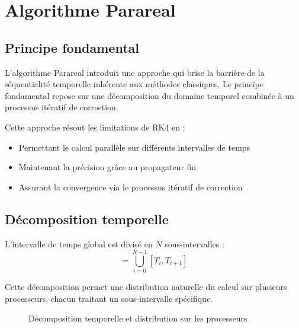 

\section{Algorithme Parareal}
\label{sec:algorithme_parareal}

\subsection{Principe fondamental}
L'algorithme Parareal introduit une approche qui brise la barrière de la séquentialité temporelle inhérente aux méthodes classiques. Le principe fondamental repose sur une décomposition du domaine temporel combinée à un processus itératif de correction.

\noindent Cette approche résout les limitations de RK4 en :
\begin{itemize}
    \item Permettant le calcul parallèle sur différents intervalles de temps
    \item Maintenant la précision grâce au propagateur fin
    \item Assurant la convergence via le processus itératif de correction
\end{itemize}

\subsection{Décomposition temporelle}
L'intervalle de temps global est divisé en $N$ sous-intervalles :
\begin{equation}
[0,T] = \bigcup_{i=0}^{N-1} [T_i,T_{i+1}]
\end{equation}

Cette décomposition permet une distribution naturelle du calcul sur plusieurs processeurs, chacun traitant un sous-intervalle spécifique.

\begin{figure}[h]
    \centering
    \caption{Décomposition temporelle et distribution sur les processeurs}
    \label{fig:decomposition}
\end{figure}


